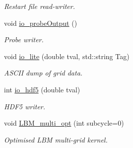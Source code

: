 \begin{DoxyCompactItemize}
\begin{DoxyCompactList}\small\item\em Restart file read-\/writer. \end{DoxyCompactList}\item 
void \hyperlink{class_grid_obj_af7e8782f95d15884d761cc4f1d5926c0}{io\+\_\+probe\+Output} ()
\begin{DoxyCompactList}\small\item\em Probe writer. \end{DoxyCompactList}\item 
void \hyperlink{class_grid_obj_acf311bbf350fd48104663eaabebca835}{io\+\_\+lite} (double tval, std\+::string Tag)
\begin{DoxyCompactList}\small\item\em A\+S\+C\+II dump of grid data. \end{DoxyCompactList}\item 
int \hyperlink{class_grid_obj_adc960ac818748b839e81d1375782caa7}{io\+\_\+hdf5} (double tval)
\begin{DoxyCompactList}\small\item\em H\+D\+F5 writer. \end{DoxyCompactList}\item 
void \hyperlink{class_grid_obj_ac65e9a1a8aa854d25281780d6b52665b}{L\+B\+M\+\_\+multi\+\_\+opt} (int subcycle=0)
\begin{DoxyCompactList}\small\item\em Optimised L\+BM multi-\/grid kernel. \end{DoxyCompactList}\end{DoxyCompactItemize}
